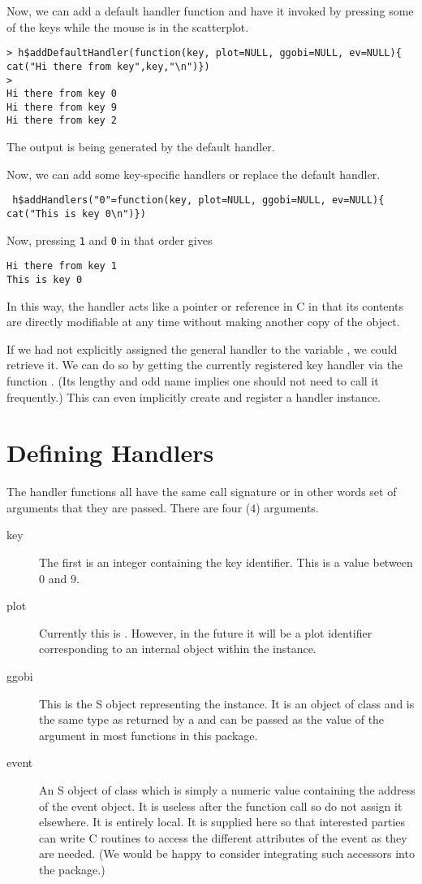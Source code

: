 \documentclass{article}
\def\Key#1{\texttt{#1}}
\begin{document}
Now, we can add a default handler function
and have it invoked by pressing some of the keys while
the mouse is in the scatterplot.
\begin{verbatim}
> h$addDefaultHandler(function(key, plot=NULL, ggobi=NULL, ev=NULL){ cat("Hi there from key",key,"\n")})
> 
Hi there from key 0 
Hi there from key 9 
Hi there from key 2 
\end{verbatim}
The output is being generated by the default handler.

Now, we can add some key-specific handlers or replace the 
default handler.
\begin{verbatim}
 h$addHandlers("0"=function(key, plot=NULL, ggobi=NULL, ev=NULL){ cat("This is key 0\n")})
\end{verbatim}
Now, pressing \Key{1} and \Key{0} in that order gives
\begin{verbatim}
Hi there from key 1 
This is key 0
\end{verbatim}

In this way, the handler acts like a pointer or reference in C in that
its contents are directly modifiable at any time without making
another copy of the object.

If we had not explicitly assigned the general handler to the variable
, we could retrieve it.  We can do so by getting the
currently registered key handler via the function
. (Its lengthy and odd name
implies one should not need to call it frequently.)  This can even
implicitly create and register a handler instance.


\section{Defining Handlers}
The handler functions all have the same  call signature
or in other words set of arguments that they are passed.
There are four ($4$) arguments.
\begin{description}
\item[key] The first is an integer containing the key identifier.
This is a value between $0$ and $9$.
\item[plot] Currently this is \SNull. However, in the future it will
  be a plot identifier corresponding to an internal 
  object within the  instance.
\item[ggobi] This is the S object representing the  
instance. It is an object of class  and is the same
type as returned by a  and can be passed
as the value of the  argument in most functions in this package.
\item[event] An S object of class  which is simply
  a numeric value containing the address of the event object.
It is useless after the function call so do not assign it
elsewhere. It is entirely local. It is supplied here so that
interested parties can write C routines to access the different
attributes of the event as they are needed. (We would be happy to consider
integrating such accessors into the package.)
\end{description}
\end{document}
